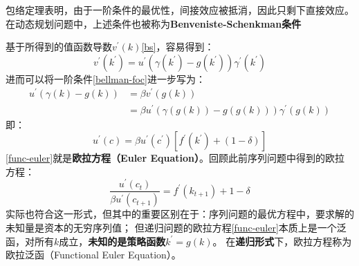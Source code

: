 包络定理表明，由于一阶条件的最优性，间接效应被抵消，因此只剩下直接效应。在动态规划问题中，上述条件也被称为\textbf{Benveniste-Schenkman条件}

基于所得到的值函数导数$v^{\prime}\left(k\right)$\cref{bs}，容易得到：
\begin{equation*}
    v^{\prime}\left(k^{\prime}\right)
    =u^{\prime}\left(\gamma\left(k^{\prime}\right)-g\left(k^{\prime}\right)\right)\gamma^{\prime}\left(k^{\prime}\right)
\end{equation*}
进而可以将一阶条件\cref{bellman-foc}进一步写为：
\begin{align}
    u^{\prime}\left(\gamma\left(k\right)-g\left(k\right)\right) 
        &= \beta v^{\prime}\left(g\left(k\right)\right) \nonumber    \\
        &= \beta u^{\prime}\left(\gamma\left(g\left(k\right)\right)-g\left(g\left(k\right)\right)\right)
            \gamma^{\prime}\left(g\left(k\right)\right) \label{func-euler}
\end{align}
即：
\begin{equation*}
    u^{\prime}\left(c\right)=\beta u^{\prime}\left(c^{\prime}\right)
        \left[f^{\prime}\left(k^{\prime}\right)+\left(1-\delta\right)\right]
\end{equation*}
\cref{func-euler}就是\textbf{欧拉方程（Euler Equation）}。回顾此前序列问题中得到的欧拉方程：
$$
\frac{u^{\prime}\left(c_t\right)}{\beta u^{\prime}\left(c_{t+1}\right)}=f^{\prime}\left(k_{t+1}\right)+1-\delta
$$
实际也符合这一形式，但其中的重要区别在于：序列问题的最优方程中，要求解的未知量是资本的无穷序列值；
但递归问题的欧拉方程\cref{func-euler}本质上是一个泛函，对所有$k$成立，\textbf{未知的是策略函数}$k^{\prime}=g\left(k\right)$。
在\textbf{递归形式}下，欧拉方程称为欧拉泛函（Functional Euler Equation）。



